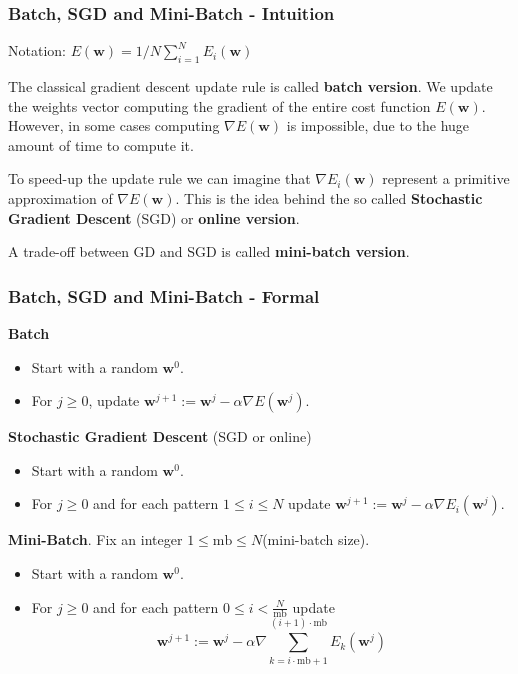 \documentclass{beamer}
\begin{document}
	\begin{frame}
		\frametitle{Batch, SGD and Mini-Batch - Intuition}
		Notation: $E(\bm{w}) = 1/N \sum_{i=1}^N E_i(\bm{w})$
		
		\vspace{5mm}
		
		
		The classical gradient descent update rule is called \textbf{batch version}. We update the weights vector computing the gradient of the entire cost function $E(\bm{w})$. However, in some cases computing $\nabla E(\bm{w})$ is impossible, due to the huge amount of time to compute it. 
		
		\vspace{5mm}
		
		To speed-up the update rule we can imagine that $\nabla E_i(\bm{w})$ represent a primitive approximation of $\nabla E(\bm{w})$. This is the idea behind the so called \textbf{Stochastic Gradient Descent} (SGD) or \textbf{online version}.
		
		\vspace{5mm}
		
		A trade-off between GD and SGD is called \textbf{mini-batch version}.
	\end{frame}

	\begin{frame}
		\frametitle{Batch, SGD and Mini-Batch - Formal}
		\textbf{Batch}
		\begin{itemize}
			\item Start with a random $\bm{w}^0$.
			\item For $j \geq 0$, update $\bm{w}^{j+1} := \bm{w}^{j} - \alpha \nabla E(\bm{w}^j)$.
		\end{itemize}
		
		\textbf{Stochastic Gradient Descent} (SGD or online)
		\begin{itemize}
			\item Start with a random $\bm{w}^0$.
			\item For $j \geq 0$ and for each pattern $1\leq i \leq N$ update $\bm{w}^{j+1} := \bm{w}^{j} - \alpha \nabla E_i(\bm{w}^j)$.
		\end{itemize}
	
		\textbf{Mini-Batch}. Fix an integer $1 \leq \text{mb} \leq N$(mini-batch size).
		\begin{itemize}
			\item Start with a random $\bm{w}^0$.
			\item For $j \geq 0$ and for each pattern $0 \leq i < \frac{N}{\text{mb}}$ update
			\begin{equation*}
				\bm{w}^{j+1} := \bm{w}^{j} - \alpha \nabla \sum_{k=i\cdot\text{mb} + 1}^{(i+1)\cdot\text{mb}}E_k(\bm{w}^j)
			\end{equation*}
		\end{itemize}
		
	\end{frame}
\end{document}
